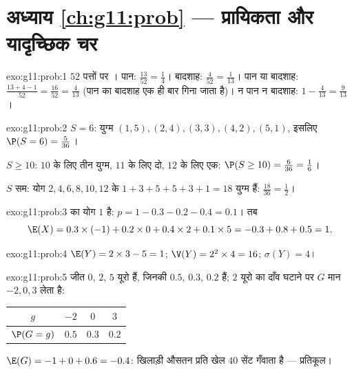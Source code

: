 \section*{अध्याय \ref{ch:g11:prob} --- प्रायिकता और यादृच्छिक चर}

\begin{solution}{exo:g11:prob:1}
$52$ पत्तों पर । पान: $\frac{13}{52} = \frac14$। बादशाह: $\frac{4}{52} = \frac{1}{13}$। पान या बादशाह: $\frac{13 + 4 - 1}{52} = \frac{16}{52} = \frac{4}{13}$
(पान का बादशाह एक ही बार गिना जाता है)। न पान न बादशाह: $1 - \frac{4}{13} = \frac{9}{13}$।
\end{solution}

\begin{solution}{exo:g11:prob:2}
$S = 6$: युग्म $(1,5), (2,4), (3,3), (4,2), (5,1)$, इसलिए $\P(S = 6) = \frac{5}{36}$।

$S \geq 10$: $10$ के लिए तीन युग्म, $11$ के लिए दो, $12$ के लिए एक: $\P(S \geq 10) = \frac{6}{36} = \frac16$।

$S$ सम: योग $2, 4, 6, 8, 10, 12$ के $1 + 3 + 5 + 5 + 3 + 1 = 18$ युग्म हैं:  $\frac{18}{36} = \frac12$।
\end{solution}

\begin{solution}{exo:g11:prob:3}
 का योग $1$ है: $p = 1 - 0.3 - 0.2 - 0.4 = 0.1$। तब
\[
\E(X) = 0.3 \times (-1) + 0.2 \times 0 + 0.4 \times 2 + 0.1 \times 5
= -0.3 + 0.8 + 0.5 = 1 .
\]
\end{solution}

\begin{solution}{exo:g11:prob:4}
$\E(Y) = 2 \times 3 - 5 = 1$; $\V(Y) = 2^2 \times 4 = 16$; $\sigma(Y) = 4$।
\end{solution}

\begin{solution}{exo:g11:prob:5}
जीत $0$, $2$, $5$ यूरो हैं, जिनकी  $0.5$, $0.3$, $0.2$ हैं; $2$
यूरो का दाँव घटाने पर $G$ मान $-2, 0, 3$ लेता है:
\begin{center}
\begin{tabular}{c|ccc}
$g$ & $-2$ & $0$ & $3$\\
\hline
$\P(G=g)$ & $0.5$ & $0.3$ & $0.2$
\end{tabular}
\end{center}
$\E(G) = -1 + 0 + 0.6 = -0.4$: खिलाड़ी औसतन प्रति खेल $40$ सेंट गँवाता है --- प्रतिकूल।
\end{solution}

